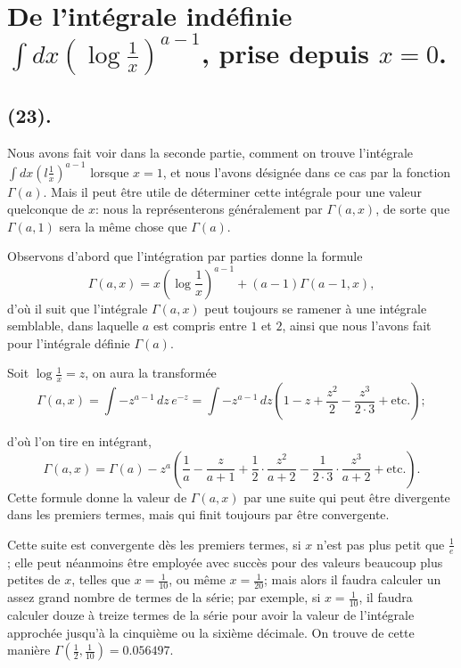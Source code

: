 \documentclass{article}
\begin{document}
\section*{De l'intégrale indéfinie $\displaystyle\int dx\left(\log\frac{1}{x}\right)^{a-1}$, prise depuis $x=0$.}

\subsection*{(23).}

Nous avons fait voir dans la seconde partie, comment on trouve l'intégrale $\displaystyle\int dx\left(l\frac{1}{x}\right)^{a-1}$ lorsque $x=1$, et nous l'avons désignée dans ce cas par la fonction $\Gamma(a)$. Mais il peut être utile de déterminer cette intégrale pour une valeur quelconque de $x$: nous la représenterons généralement par $\Gamma(a,x)$, de sorte que $\Gamma(a,1)$ sera la même chose que $\Gamma(a)$.

Observons d'abord que l'intégration par parties donne la formule
\[ \Gamma(a,x)=x\left(\log\frac{1}{x}\right)^{a-1}+(a-1)\Gamma(a-1,x), \tag{1} \]
d'où il suit que l'intégrale $\Gamma(a,x)$ peut toujours se ramener à une intégrale semblable, dans laquelle $a$ est compris entre $1$ et $2$, ainsi que nous l'avons fait pour l'intégrale définie $\Gamma(a)$.

Soit $\log\frac{1}{x}=z$, on aura la transformée
\[ \Gamma(a,x)=\int -z^{a-1}\,dz\,e^{-z}=\int -z^{a-1}\,dz\left(1-z+\frac{z^{2}}{2}-\frac{z^{3}}{2\cdot3}+\text{etc.}\right); \]

d'où l'on tire en intégrant,
\[ \Gamma(a,x)=\Gamma(a)-z^{a}\left(\frac{1}{a}-\frac{z}{a+1}+\frac{1}{2}\cdot\frac{z^{2}}{a+2}-\frac{1}{2\cdot3}\cdot\frac{z^{3}}{a+2}+\text{etc.}\right). \tag{2} \]
Cette formule donne la valeur de $\Gamma(a,x)$ par une suite qui peut être divergente dans les premiers termes, mais qui finit toujours par être convergente.

Cette suite est convergente dès les premiers termes, si $x$ n'est pas plus petit que $\frac{1}{e}$; elle peut néanmoins être employée avec succès pour des valeurs beaucoup plus petites de $x$, telles que $x=\frac{1}{10}$, ou même $x=\frac{1}{20}$; mais alors il faudra calculer un assez grand nombre de termes de la série; par exemple, si $x=\frac{1}{10}$, il faudra calculer douze à treize termes de la série pour avoir la valeur de l'intégrale approchée jusqu'à la cinquième ou la sixième décimale. On trouve de cette manière $\Gamma\left(\frac{1}{2},\frac{1}{10}\right)=0.056497$.
\end{document}
